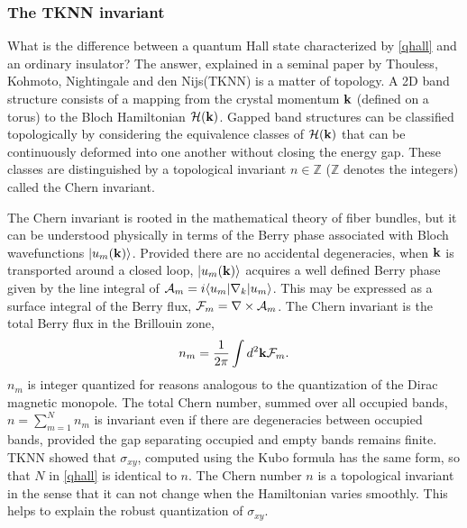 \documentclass[twocolumn,floatfix,showpacs,rmp,aps]{revtex4}
\begin{document}
\subsubsection{The TKNN invariant}
\label{sec:tknn}

What is the difference between a
quantum Hall state characterized by \eqref{qhall} and an ordinary insulator?
The answer, explained in a seminal \citeyear{thouless82} paper by
Thouless, Kohmoto, Nightingale and den Nijs(TKNN) is a matter of topology.
A 2D band structure consists of a
mapping from the crystal momentum ${\bf k}$ (defined on a torus)
to the Bloch Hamiltonian ${\cal H}({\bf k})$.
Gapped band structures can
be classified topologically by considering the equivalence classes of
${\cal H}({\bf k})$ that can be continuously deformed into one another
without closing the energy gap.  These classes are distinguished by a
topological invariant $n \in \mathbb{Z}$ ($\mathbb{Z}$ denotes the integers)
called the Chern invariant.

The Chern invariant is rooted in the mathematical
theory of fiber bundles\cite{nakahara90}, but it
can be understood physically in terms of the Berry phase\cite{berry84} associated
with Bloch wavefunctions $|u_m({\bf k})\rangle$.  Provided
there are no accidental degeneracies, when ${\bf k}$ is transported around a
closed loop, $|u_m({\bf k})\rangle$ acquires a well defined Berry phase given by the
line integral of ${\cal A}_m = i\langle u_m|\nabla_k|u_m\rangle$.
This may be expressed as a surface integral of the Berry
flux, ${\cal F}_m = \nabla\times{\cal A}_m$.  The Chern invariant is the total
Berry flux in the Brillouin zone,
\begin{equation}
n_m = \frac{1}{2\pi} \int d^2{\bf k} {\cal F}_m.
 \label{chern}
\end{equation}
$n_m$ is integer quantized for reasons analogous to the quantization of the
Dirac magnetic monopole.  The total Chern number, summed over all occupied bands,
$n = \sum_{m=1}^N n_m$
is invariant even if there are degeneracies between
occupied bands, provided the gap separating occupied and empty bands remains
finite.
TKNN showed that $\sigma_{xy}$, computed using the Kubo formula
has the same form, so that $N$ in \eqref{qhall} is identical to
$n$.  The Chern number $n$ is a topological
invariant in the sense that it can not change when the Hamiltonian
varies smoothly.   This helps
to explain the robust quantization of $\sigma_{xy}$.
\end{document}
